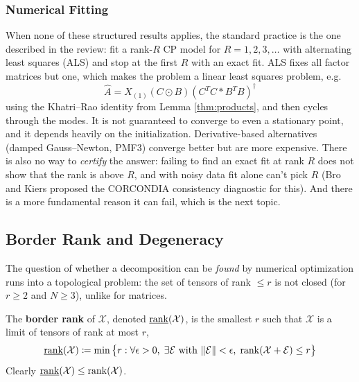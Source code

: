   \subsubsection{Numerical Fitting}

    When none of these structured results applies, the standard practice is the one described in the review: fit a rank-$R$ CP model for $R = 1, 2, 3, \ldots$ with alternating least squares (ALS) and stop at the first $R$ with an exact fit. ALS fixes all factor matrices but one, which makes the problem a linear least squares problem, e.g.
    \begin{equation}
      \hat{A} = X_{(1)} (C \odot B) (C^T C * B^T B)^\dagger
    \end{equation}
    using the Khatri--Rao identity from Lemma \ref{thm:products}, and then cycles through the modes. It is not guaranteed to converge to even a stationary point, and it depends heavily on the initialization. Derivative-based alternatives (damped Gauss--Newton, PMF3) converge better but are more expensive. There is also no way to \textit{certify} the answer: failing to find an exact fit at rank $R$ does not show that the rank is above $R$, and with noisy data fit alone can't pick $R$ (Bro and Kiers proposed the CORCONDIA consistency diagnostic for this). And there is a more fundamental reason it can fail, which is the next topic.

\subsection{Border Rank and Degeneracy}

  The question of whether a decomposition can be \textit{found} by numerical optimization runs into a topological problem: the set of tensors of rank $\leq r$ is not closed (for $r \geq 2$ and $N \geq 3$), unlike for matrices.

  \begin{definition}
    \label{def:border-rank}
    The \textbf{border rank} of $\mathcal{X}$, denoted $\underline{\mathrm{rank}}(\mathcal{X})$, is the smallest $r$ such that $\mathcal{X}$ is a limit of tensors of rank at most $r$,
    \begin{equation}
      \underline{\mathrm{rank}}(\mathcal{X}) \coloneqq \min \big\{ r : \forall \epsilon > 0, \; \exists \mathcal{E} \text{ with } \|\mathcal{E}\| < \epsilon, \; \mathrm{rank}(\mathcal{X} + \mathcal{E}) \leq r \big\}
    \end{equation}
    Clearly $\underline{\mathrm{rank}}(\mathcal{X}) \leq \mathrm{rank}(\mathcal{X})$.
  \end{definition}

